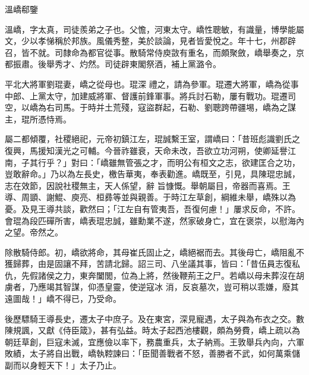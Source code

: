 
\begin{pinyinscope}
溫嶠郗鑒



 溫嶠，字太真，司徒羨弟之子也。父憺，河東太守。嶠性聰敏，有識量，博學能屬文，少以孝悌稱於邦族。風儀秀整，美於談論，見者皆愛悅之。年十七，州郡辟召，皆不就。司隸命為都官從事。散騎常侍庾敳有重名，而頗聚斂，嶠舉奏之，京都振肅。後舉秀才、灼然。司徒辟東閣祭酒，補上黨潞令。



 平北大將軍劉琨妻，嶠之從母也。琨深
 禮之，請為參軍。琨遷大將軍，嶠為從事中郎、上黨太守，加建威將軍、督護前鋒軍事。將兵討石勒，屢有戰功。琨遷司空，以嶠為右司馬。于時并土荒殘，寇盜群起，石勒、劉聰跨帶疆埸，嶠為之謀主，琨所憑恃焉。



 屬二都傾覆，社稷絕祀，元帝初鎮江左，琨誠繫王室，謂嶠曰：「昔班彪識劉氏之復興，馬援知漢光之可輔。今晉祚雖衰，天命未改，吾欲立功河朔，使卿延譽江南，子其行乎？」對曰：「嶠雖無管張之才，而明公有桓文之志，欲建匡合之功，豈敢辭命。」乃以為左長史，檄告華夷，奉表勸進。嶠既至，引見，具陳琨忠誠，志在效節，因說社稷無主，天人係望，辭
 旨慷慨。舉朝屬目，帝器而喜焉。王導、周顗、謝鯤、庾亮、桓彞等並與親善。于時江左草創，綱維未舉，嶠殊以為憂。及見王導共談，歡然曰；「江左自有管夷吾，吾復何慮！」屢求反命，不許。會琨為段匹磾所害，嶠表琨忠誠，雖勳業不遂，然家破身亡，宜在褒崇，以慰海內之望。帝然之。



 除散騎侍郎。初，嶠欲將命，其母崔氏固止之，嶠絕裾而去。其後母亡，嶠阻亂不獲歸葬，由是固讓不拜，苦請北歸。詔三司、八坐議其事，皆曰：「昔伍員志復私仇，先假諸侯之力，東奔闔閭，位為上將，然後鞭荊王之尸。若嶠以母未葬沒在胡虜者，乃應竭其智謀，仰憑皇靈，使逆寇冰
 消，反哀墓次，豈可稍以乖嫌，廢其遠圖哉！」嶠不得已，乃受命。



 後歷驃騎王導長史，遷太子中庶子。及在東宮，深見寵遇，太子與為布衣之交。數陳規諷，又獻《侍臣箴》，甚有弘益。時太子起西池樓觀，頗為勞費，嶠上疏以為朝廷草創，巨寇未滅，宜應儉以率下，務農重兵，太子納焉。王敦舉兵內向，六軍敗績，太子將自出戰，嶠執鞚諫曰：「臣聞善戰者不怒，善勝者不武，如何萬乘儲副而以身輕天下！」太子乃止。




\end{pinyinscope}
